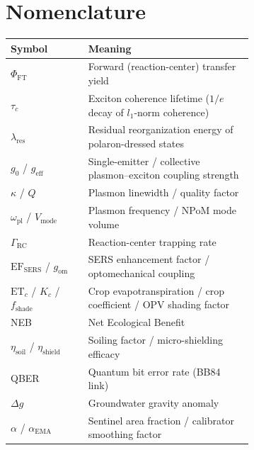\documentclass[preprint,12pt]{elsarticle}
\begin{document}
\section*{Nomenclature}
\small
\begin{tabular}{@{}l p{0.68\linewidth}@{}}
\toprule
\textbf{Symbol} & \textbf{Meaning} \\
\midrule
$\Phi_{\mathrm{FT}}$ & Forward (reaction-center) transfer yield \\
$\tau_c$ & Exciton coherence lifetime ($1/e$ decay of $l_1$-norm coherence) \\
$\lambda_{\mathrm{res}}$ & Residual reorganization energy of polaron-dressed states \\
$g_0$ / $g_{\mathrm{eff}}$ & Single-emitter / collective plasmon--exciton coupling strength \\
$\kappa$ / $Q$ & Plasmon linewidth / quality factor \\
$\omega_{\mathrm{pl}}$ / $V_{\mathrm{mode}}$ & Plasmon frequency / NPoM mode volume \\
$\Gamma_{\mathrm{RC}}$ & Reaction-center trapping rate \\
$\mathrm{EF}_{\mathrm{SERS}}$ / $g_{\mathrm{om}}$ & SERS enhancement factor / optomechanical coupling \\
$\mathrm{ET}_c$ / $K_c$ / $f_{\mathrm{shade}}$ & Crop evapotranspiration / crop coefficient / OPV shading factor \\
NEB & Net Ecological Benefit \\
$\eta_{\mathrm{soil}}$ / $\eta_{\mathrm{shield}}$ & Soiling factor / micro-shielding efficacy \\
QBER & Quantum bit error rate (BB84 link) \\
$\Delta g$ & Groundwater gravity anomaly \\
$\alpha$ / $\alpha_{\mathrm{EMA}}$ & Sentinel area fraction / calibrator smoothing factor \\
\bottomrule
\end{tabular}

\end{document}
